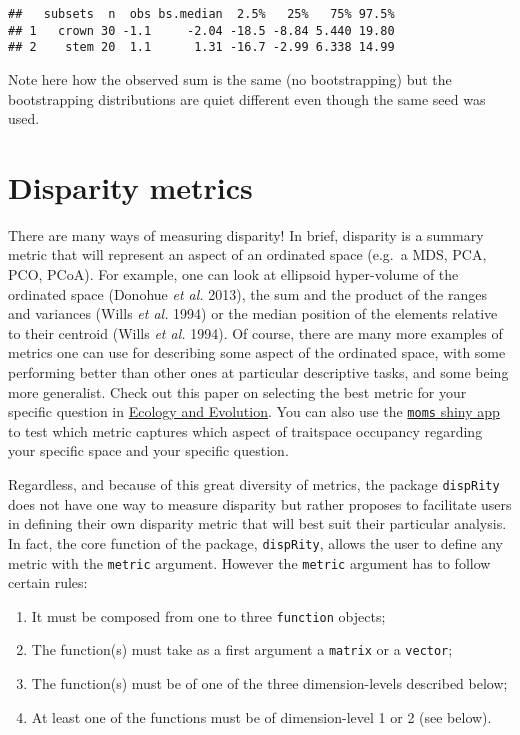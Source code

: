 \documentclass[
]{book}
\providecommand{\tightlist}{%
  \setlength{\itemsep}{0pt}\setlength{\parskip}{0pt}}
\begin{document}
\begin{verbatim}
##   subsets  n  obs bs.median  2.5%   25%   75% 97.5%
## 1   crown 30 -1.1     -2.04 -18.5 -8.84 5.440 19.80
## 2    stem 20  1.1      1.31 -16.7 -2.99 6.338 14.99
\end{verbatim}

Note here how the observed sum is the same (no bootstrapping) but the bootstrapping distributions are quiet different even though the same seed was used.

\hypertarget{disparity-metrics}{%
\section{Disparity metrics}\label{disparity-metrics}}

There are many ways of measuring disparity!
In brief, disparity is a summary metric that will represent an aspect of an ordinated space (e.g.~a MDS, PCA, PCO, PCoA).
For example, one can look at ellipsoid hyper-volume of the ordinated space (Donohue \emph{et al.} 2013), the sum and the product of the ranges and variances (Wills \emph{et al.} 1994) or the median position of the elements relative to their centroid (Wills \emph{et al.} 1994).
Of course, there are many more examples of metrics one can use for describing some aspect of the ordinated space, with some performing better than other ones at particular descriptive tasks, and some being more generalist.
Check out this paper on selecting the best metric for your specific question in \href{https://onlinelibrary.wiley.com/doi/full/10.1002/ece3.6452}{Ecology and Evolution}.
You can also use the \href{https://tguillerme.shinyapps.io/moms/}{\texttt{moms} shiny app} to test which metric captures which aspect of traitspace occupancy regarding your specific space and your specific question.

Regardless, and because of this great diversity of metrics, the package \texttt{dispRity} does not have one way to measure disparity but rather proposes to facilitate users in defining their own disparity metric that will best suit their particular analysis.
In fact, the core function of the package, \texttt{dispRity}, allows the user to define any metric with the \texttt{metric} argument.
However the \texttt{metric} argument has to follow certain rules:

\begin{enumerate}
\def\labelenumi{\arabic{enumi}.}
\tightlist
\item
  It must be composed from one to three \texttt{function} objects;
\item
  The function(s) must take as a first argument a \texttt{matrix} or a \texttt{vector};
\item
  The function(s) must be of one of the three dimension-levels described below;
\item
  At least one of the functions must be of dimension-level 1 or 2 (see below).
\end{enumerate}
\end{document}
